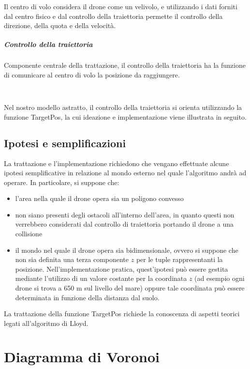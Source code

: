 \documentclass[11pt,a4paper]{report}
\newcommand{\name}[1]{{\ttfamily #1}}
\begin{document}
Il centro di volo considera il drone come un velivolo, e utilizzando i dati forniti dal centro fisico e dal controllo della traiettoria permette il controllo della direzione, della quota e della velocità.

\paragraph{Controllo della traiettoria}

Componente centrale della trattazione, il controllo della traiettoria ha la funzione di comunicare al centro di volo la posizione da raggiungere.

\

Nel nostro modello astratto, il controllo della traiettoria si orienta utilizzando la funzione \name{TargetPos}, la cui ideazione e implementazione viene illustrata in seguito.

\section{Ipotesi e semplificazioni}


La trattazione e l'implementazione richiedono che vengano effettuate alcune ipotesi semplificative in relazione al mondo esterno nel quale l'algoritmo andrà ad operare. In particolare, si suppone che:

\begin{itemize}
	\item l'area nella quale il drone opera sia un poligono convesso
	\item non siano presenti degli ostacoli all'interno dell'area, in quanto questi non verrebbero considerati dal controllo di traiettoria portando il drone a una collisione
	\item il mondo nel quale il drone opera sia bidimensionale, ovvero si suppone che non sia definita una terza componente $z$ per le tuple rappresentanti la posizione. Nell'implementazione pratica, quest'ipotesi può essere gestita mediante l'utilizzo di un valore costante per la coordinata $z$ (ad esempio ogni drone si trova a 650 m sul livello del mare) oppure tale coordinata può essere determinata in funzione della distanza dal suolo.
\end{itemize}

La trattazione della funzione \name{TargetPos} richiede la conoscenza di aspetti teorici legati all'algoritmo di Lloyd.

\chapter{Diagramma di Voronoi}
\end{document}
